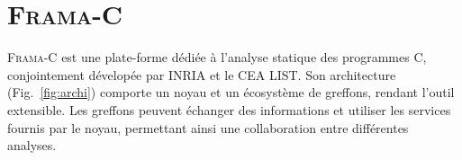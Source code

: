 
\chapter{\textsc{Frama-C}}


\textsc{Frama-C} \cite{Frama-C} est une plate-forme dédiée à l'analyse statique
des programmes C, conjointement dévelopée par INRIA et le CEA LIST. Son
architecture (Fig.~\ref{fig:archi}) comporte un noyau et un écosystème de
greffons, rendant l’outil extensible. Les greffons peuvent échanger des
informations et utiliser les  services fournis par le noyau, permettant ainsi
une collaboration entre différentes analyses.\\


\newcommand{\lang}[1]{\textsf{\small #1}\xspace}
\newcommand{\cil}{\lang{CIL}}
\newcommand{\C}{\lang{C}}
\newcommand{\ACSL}{\lang{ACSL}}
\newcommand{\JML}{\lang{JML}}
\newcommand{\framac}{\lang{Frama-C}}
\newcommand{\pathcrawler}{\lang{PathCrawler}}
\newcommand{\colibri}{\lang{Colibri}}


